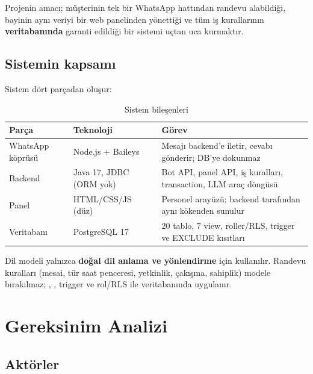 \documentclass[11pt,a4paper]{article}
\newcommand{\kod}[1]{\texttt{\detokenize{#1}}}
\begin{document}
Projenin amacı; müşterinin tek bir WhatsApp hattından randevu alabildiği, bayinin
aynı veriyi bir web panelinden yönettiği ve tüm iş kurallarının \textbf{veritabanında}
garanti edildiği bir sistemi uçtan uca kurmaktır.

\subsection{Sistemin kapsamı}

Sistem dört parçadan oluşur:

\begin{table}[H]
\centering
\small
\begin{tabularx}{\textwidth}{@{}l l X@{}}
\toprule
Parça & Teknoloji & Görev\\
\midrule
WhatsApp köprüsü & Node.js + Baileys & Mesajı backend'e iletir, cevabı gönderir; DB'ye dokunmaz\\
Backend & Java 17, JDBC (ORM yok) & Bot API, panel API, iş kuralları, transaction, LLM araç döngüsü\\
Panel & HTML/CSS/JS (düz) & Personel arayüzü; backend tarafından aynı kökenden sunulur\\
Veritabanı & PostgreSQL 17 & 20 tablo, 7 view, roller/RLS, trigger ve EXCLUDE kısıtları\\
\bottomrule
\end{tabularx}
\caption{Sistem bileşenleri}
\label{tab:bilesenler}
\end{table}

Dil modeli yalnızca \textbf{doğal dil anlama ve yönlendirme} için kullanılır.
Randevu kuralları (mesai, tür saat penceresi, yetkinlik, çakışma, sahiplik) modele
bırakılmaz; \kod{CHECK}, \kod{EXCLUDE}, trigger ve rol/RLS ile veritabanında uygulanır.

\section{Gereksinim Analizi}

\subsection{Aktörler}
\end{document}
